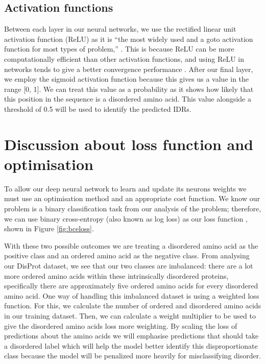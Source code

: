 \documentclass{l4proj}
\begin{document}
\subsection{Activation functions}
\label{chap:design section:activations}
Between each layer in our neural networks, we use the rectified linear unit activation function (ReLU) as it is “the most widely used and a goto activation function for most types of problem,” \citep{Keerthi:22}. This is because ReLU can be more computationally efficient than other activation functions, and using ReLU in networks tends to give a better convergence performance \citep{BerenLuthien:16}. After our final layer, we employ the sigmoid activation function because this gives us a value in the range [0, 1]. We can treat this value as a probability as it shows how likely that this position in the sequence is a disordered amino acid. This value alongside a threshold of 0.5 will be used to identify the predicted IDRs.

\section{Discussion about loss function and optimisation}
\label{sec:loss design}
To allow our deep neural network to learn and update its neurons weights we must use an optimisation method and an appropriate cost function. We know our problem is a binary classification task from our analysis of the problem; therefore, we can use binary cross-entropy (also known as log loss) as our loss function \citep{Godoy:18}, shown in Figure \ref{fig:bceloss}.  

With these two possible outcomes we are treating a disordered amino acid as the positive class and an ordered amino acid as the negative class. From analysing our DisProt dataset, we see that our two classes are imbalanced: there are a lot more ordered amino acids within these intrinsically disordered proteins, specifically there are approximately five ordered amino acids for every disordered amino acid. One way of handling this imbalanced dataset is using a weighted loss function. For this, we calculate the number of ordered and disordered amino acids in our training dataset. Then, we can calculate a weight multiplier to be used to give the disordered amino acids loss more weighting. By scaling the loss of predictions about the amino acids we will emphasise predictions that should take a disordered label which will help the model better identify this disproportionate class because the model will be penalized more heavily for misclassifying disorder. 
\end{document}
